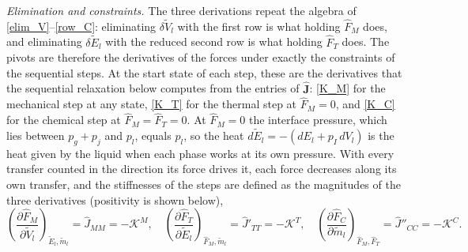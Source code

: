 \emph{Elimination and constraints.} The three derivations repeat the algebra of \eqref{elim_V}--\eqref{row_C}: eliminating $\delta\tilde{V}_l$ with the first row is what holding $\hat{F}_M$ does, and eliminating $\delta\tilde{E}_l$ with the reduced second row is what holding $\hat{F}_T$ does. The pivots are therefore the derivatives of the forces under exactly the constraints of the sequential steps. At the start state of each step, these are the derivatives that the sequential relaxation below computes from the entries of $\hat{\boldsymbol{J}}$: \eqref{K_M} for the mechanical step at any state, \eqref{K_T} for the thermal step at $\hat{F}_M=0$, and \eqref{K_C} for the chemical step at $\hat{F}_M=\hat{F}_T=0$. At $\hat{F}_M=0$ the interface pressure, which lies between $p_g+p_{j}$ and $p_l$, equals $p_l$, so the heat $d\tilde{E}_l=-(dE_l+p_I\,dV_l)$ is the heat given by the liquid when each phase works at its own pressure. With every transfer counted in the direction its force drives it, each force decreases along its own transfer, and the stiffnesses of the steps are defined as the magnitudes of the three derivatives (positivity is shown below),
\begin{equation}\label{stiff_def}
\left(\frac{\partial \hat{F}_M}{\partial\tilde{V}_l}\right)_{\tilde{E}_l,\tilde{m}_l}=\hat{J}_{MM}=-\mathcal{K}^M,\quad \left(\frac{\partial \hat{F}_T}{\partial\tilde{E}_l}\right)_{\hat{F}_M,\tilde{m}_l}=\hat{J}'_{TT}=-\mathcal{K}^T,\quad \left(\frac{\partial \hat{F}_C}{\partial\tilde{m}_l}\right)_{\hat{F}_M,\hat{F}_T}=\hat{J}''_{CC}=-\mathcal{K}^C .
\end{equation}

